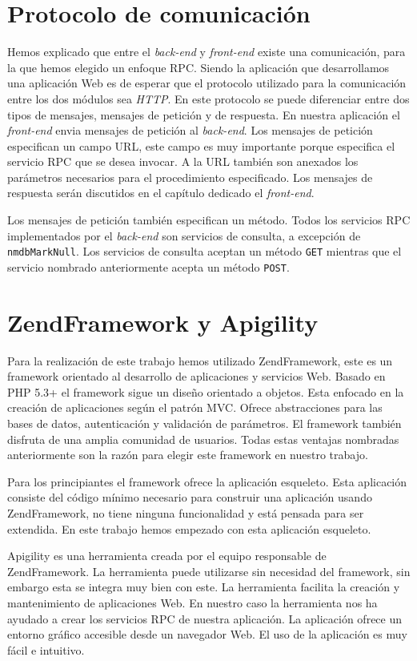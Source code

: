 \section{Protocolo de comunicación}
	Hemos explicado que entre el \emph{back-end} y \emph{front-end} existe una comunicación, para la que hemos elegido un enfoque RPC. Siendo la
	aplicación que desarrollamos una aplicación Web es de esperar que el protocolo utilizado para la comunicación entre los dos módulos sea
	\emph{HTTP}. En este protocolo se puede diferenciar entre dos tipos de mensajes, mensajes de petición y de respuesta. En nuestra aplicación el
	\emph{front-end} envia mensajes de petición al \emph{back-end}. Los mensajes de petición especifican un campo URL, este campo es muy
	importante porque especifica el servicio RPC que se desea invocar. A la URL también son anexados los parámetros necesarios para el
	procedimiento especificado. Los mensajes de respuesta serán discutidos en el capítulo dedicado el \emph{front-end}.
	\par
	Los mensajes de petición también especifican un método. Todos los servicios RPC implementados por el \emph{back-end} son servicios de
	consulta, a excepción de \texttt{nmdbMarkNull}. Los servicios de consulta aceptan un método \texttt{GET} mientras que el servicio nombrado
	anteriormente acepta un método \texttt{POST}.
\section{ZendFramework y Apigility}
	Para la realización de este trabajo hemos utilizado ZendFramework, este es un framework orientado al desarrollo de aplicaciones y servicios
	Web. Basado en PHP 5.3+ el framework sigue un diseño orientado a objetos. Esta enfocado en la creación de aplicaciones según el patrón MVC.
	Ofrece abstracciones para las bases de datos, autenticación y validación de parámetros. El framework también disfruta de una amplia comunidad
	de usuarios. Todas estas ventajas nombradas anteriormente son la razón para elegir este framework en nuestro trabajo.
	\par
	Para los principiantes el framework ofrece la aplicación esqueleto. Esta aplicación consiste del código mínimo necesario para construir una
	aplicación usando ZendFramework, no tiene ninguna funcionalidad y está pensada para ser extendida. En este trabajo hemos empezado con esta
	aplicación esqueleto.
  	\par
	Apigility es una herramienta creada por el equipo responsable de ZendFramework. La herramienta puede utilizarse sin necesidad del framework,
	sin embargo esta se integra muy bien con este. La herramienta facilita la creación y mantenimiento de aplicaciones Web. En nuestro caso la
	herramienta nos ha ayudado a crear los servicios RPC de nuestra aplicación. La aplicación ofrece un entorno gráfico accesible desde un
	navegador Web. El uso de la aplicación es muy fácil e intuitivo.
